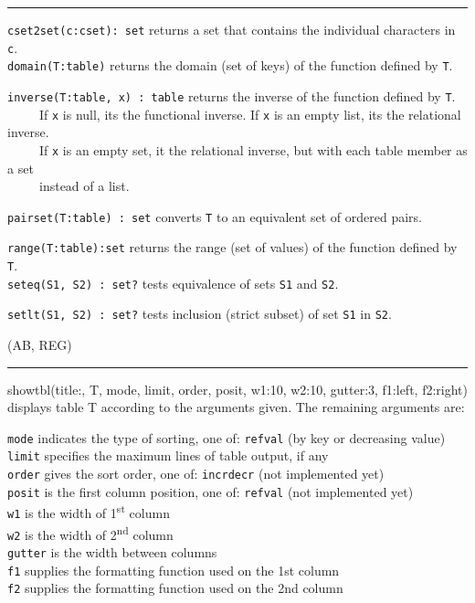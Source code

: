 \vspace{0.25cm}\hrule{}

\texttt{cset2set(c:cset): set} returns a set that contains the
individual characters in \texttt{c}.\\
\texttt{domain(T:table)} returns the domain (set of keys) of the
function defined by \texttt{T}.

\texttt{inverse(T:table, x) : table} returns the inverse of the function
defined by \texttt{T}.\\
 \ \ \ \ \ If \texttt{x} is null, it{\textquotesingle}s the functional
inverse. If \texttt{x} is an empty list, it{\textquotesingle}s the
relational inverse.\\
 \ \ \ \ \ If \texttt{x} is an empty set, it the relational inverse, but
with each table member as a set\\
 \ \ \ \ \ instead of a list.

\texttt{pairset(T:table) : set} converts \texttt{T} to an equivalent set
of ordered pairs.

\texttt{range(T:table):set} returns the range (set of values) of the
function defined by \texttt{T}.\\
\texttt{seteq(S1, S2) : set?} tests equivalence
of sets \texttt{S1} and \texttt{S2}.

\texttt{setlt(S1, S2) : set?} tests inclusion (strict subset) of set
\texttt{S1} in \texttt{S2}. 

(AB, REG)

\vspace{0.25cm}\hrule{}

\textsf{showtbl(title:{\textquotedbl}{\textquotedbl}, T, mode, limit,
order, posit, w1:10, w2:10, gutter:3, f1:left, f2:right)} displays
table T according to the arguments given. The remaining arguments are:

\texttt{mode} indicates the type of sorting, one of:
\texttt{{\textquotedbl}ref{\textquotedbl}{\textbar}{\textquotedbl}val{\textquotedbl}}
(by key or decreasing value)\\
\texttt{limit} specifies the maximum lines of table output, if
any\\
\texttt{order} gives the sort order, one of:
\texttt{{\textquotedbl}incr{\textquotedbl}{\textbar}{\textquotedbl}decr{\textquotedbl}}
(not implemented yet)\\
\texttt{posit} is the first column position, one of:
\texttt{{\textquotedbl}ref{\textquotedbl}{\textbar}{\textquotedbl}val{\textquotedbl}}
(not implemented yet)\\
\texttt{w1} is the width of 1\textsuperscript{st} column\\
\texttt{w2} is the width of 2\textsuperscript{nd} column\\
\texttt{gutter} is the width between columns\\
\texttt{f1} supplies the formatting function used on the 1st
column\\
\texttt{f2} supplies the formatting function used on the 2nd column

